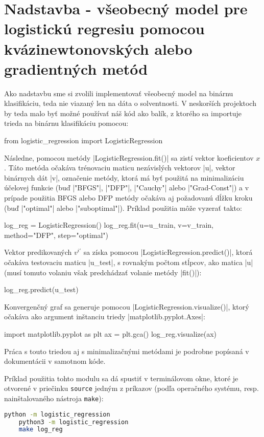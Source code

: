 \documentclass[report.tex]{subfiles}
\begin{document}
	
\section{Nadstavba - všeobecný model pre logistickú regresiu pomocou kvázinewtonovských alebo gradientných metód}\label{sec:H}

Ako nadstavbu sme si zvolili implementovať všeobecný model na binárnu klasifikáciu, teda nie viazaný len na dáta o solventnosti. V neskorších projektoch by teda malo byť možné používať náš kód ako balík, z ktorého sa importuje trieda na binárnu klasifikáciu pomocou:

\begin{python}
	from logistic_regression import LogisticRegression
\end{python}

Následne, pomocou metódy \pyth|LogisticRegression.fit()| sa zistí vektor koeficientov $x$. Táto metóda očakáva trénovaciu maticu nezávislých vektorov \pyth|u|, vektor binárnych dát \pyth|v|, označenie metódy, ktorá má byť použitá na minimalizáciu účelovej funkcie (buď \pyth|"BFGS"|, \pyth|"DFP"|, \pyth|"Cauchy"| alebo \pyth|"Grad-Const"|) a v prípade použitia BFGS alebo DFP metódy očakáva aj požadovanú dĺžku kroku (buď \pyth|"optimal"| alebo \pyth|"suboptimal"|). Príklad použitia môže vyzerať takto:

\begin{python}
	log_reg = LogisticRegression()
	log_reg.fit(u=u_train, v=v_train, method="DFP", step="optimal")
\end{python}

Vektor predikovaných $v^{i'}$ sa získa pomocou \pyth|LogisticRegression.predict()|, ktorá očakáva testovaciu maticu \pyth|u_test|, s rovnakým počtom stĺpcov, ako matica \pyth|u| (musí tomuto volaniu však predchádzať volanie metódy \pyth|fit()|):

\begin{python}
	log_reg.predict(u_test)
\end{python}

Konvergenčný graf sa generuje pomocou \pyth|LogisticRegression.visualize()|, ktorý očakáva ako argument inštanciu triedy \pyth|matplotlib.pyplot.Axes|:

\begin{python}
	import matplotlib.pyplot as plt
	ax = plt.gca()
	log_reg.visualize(ax)
\end{python}

Práca s touto triedou aj s minimalizačnými metódami je podrobne popísaná v dokumentácii v samotnom kóde.

Príklad použitia tohto modulu sa dá spustiť v terminálovom okne, ktoré je otvorené v priečinku \verb*|source| jedným z príkazov (podľa operačného systému, resp. nainštalovaného nástroja \verb*|make|):

\begin{lstlisting}[style=terminal, language=bash]
	python -m logistic_regression
	python3 -m logistic_regression
	make log_reg
\end{lstlisting}

	
\end{document}
